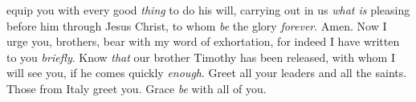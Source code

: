 \begin{biblechapter}
\verse equip you with every good \textit{thing} to do his will, carrying out in us \textit{what is} pleasing before him through Jesus Christ, to whom \textit{be} the glory \textit{forever}. Amen.
 Now I urge you, brothers, bear with my word of exhortation, for indeed I have written to you \textit{briefly}.
\verse Know \textit{that} our brother Timothy has been released, with whom I will see you, if he comes quickly \textit{enough}.
\verse Greet all your leaders and all the saints. Those from Italy greet you.
\verse Grace \textit{be} with all of you.
\end{biblechapter}

